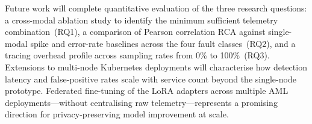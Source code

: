 \documentclass[a4paper,anonymous,UKenglish]{lipics-v2021}
\begin{document}
Future work will complete quantitative evaluation of the three research
questions: a cross-modal ablation study to identify the minimum sufficient
telemetry combination~(RQ1), a comparison of Pearson correlation RCA against
single-modal spike and error-rate baselines across the four fault classes~(RQ2),
and a tracing overhead profile across sampling rates from 0\% to 100\%~(RQ3).
Extensions to multi-node Kubernetes deployments will characterise how detection
latency and false-positive rates scale with service count beyond the
single-node prototype. Federated fine-tuning of the LoRA adapters across
multiple AML deployments---without centralising raw telemetry---represents a
promising direction for privacy-preserving model improvement at scale.


\end{document}
